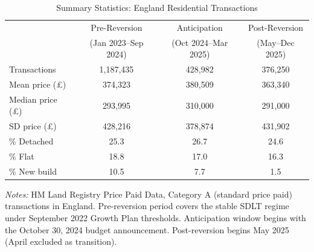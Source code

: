 \begin{table}[htbp]
\centering
\caption{Summary Statistics: England Residential Transactions}
\label{tab:summary}
\begin{tabular}{lccc}
\hline\hline
 & Pre-Reversion & Anticipation & Post-Reversion \\
 & (Jan 2023--Sep 2024) & (Oct 2024--Mar 2025) & (May--Dec 2025) \\
\hline
Transactions & 1,187,435 & 428,982 & 376,250 \\
Mean price (\pounds) & 374,323 & 380,509 & 363,340 \\
Median price (\pounds) & 293,995 & 310,000 & 291,000 \\
SD price (\pounds) & 428,216 & 378,874 & 431,902 \\
\% Detached & 25.3 & 26.7 & 24.6 \\
\% Flat & 18.8 & 17.0 & 16.3 \\
\% New build & 10.5 & 7.7 & 1.5 \\
\hline\hline
\end{tabular}
\begin{tablenotes}
\item \textit{Notes:} HM Land Registry Price Paid Data, Category A (standard price paid) transactions in England. Pre-reversion period covers the stable SDLT regime under September 2022 Growth Plan thresholds. Anticipation window begins with the October 30, 2024 budget announcement. Post-reversion begins May 2025 (April excluded as transition).
\end{tablenotes}
\end{table}
